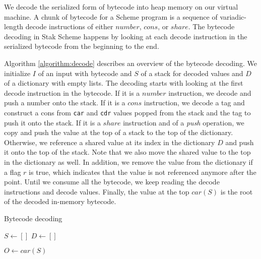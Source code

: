 \documentclass[sigplan, anonymous, review]{acmart}
\begin{document}
We decode the serialized form of bytecode into heap memory on
our virtual machine.
A chunk of bytecode for a Scheme program is a sequence of
variadic-length decode instructions of either $number$, $cons$, or $share$.
The bytecode decoding in Stak Scheme happens by looking at each
decode instruction in
the serialized bytecode from the beginning to the end.

Algorithm \ref{algorithm:decode} describes an overview of the
bytecode decoding.
We initialize $I$ of an input with bytecode and $S$ of a stack for decoded
values and $D$ of a dictionary with empty lists.
The decoding starts with looking at the first decode instruction in
the bytecode.
If it is a $number$ instruction, we decode and push a number onto the stack.
If it is a $cons$ instruction, we decode a tag and construct a cons
from \texttt{car} and \texttt{cdr} values popped from the stack
and the tag to push it onto the stack.
If it is a $share$ instruction and of a \textit{push} operation, we
copy and push the value at the top of a stack to the top of the dictionary.
Otherwise, we reference a shared value at its index in the
dictionary $D$ and push it onto the top of the stack.
Note that we also move the shared value to the top in the dictionary as well.
In addition, we remove the value from the dictionary if a flag $r$ is
true, which indicates that the value is not referenced anymore after the point.
Until we consume all the bytecode, we keep reading the decode instructions and
decode values.
Finally, the value at the top $car(S)$ is the root of the decoded
in-memory bytecode.

\begin{algorithm}
  \caption{Bytecode decoding}
  \label{algorithm:decode}


  $S \gets []$ \;
  $D \gets []$ \;

  $O \gets car(S)$ \;
\end{algorithm}
\end{document}
